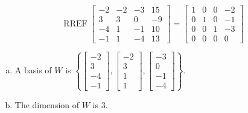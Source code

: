 \begin{exerciseAnswer} 


\[\operatorname{RREF} \left[\begin{array}{cccc}
-2 & -2 & -3 & 15 \\
3 & 3 & 0 & -9 \\
-4 & 1 & -1 & 10 \\
-1 & 1 & -4 & 13
\end{array}\right] = \left[\begin{array}{cccc}
1 & 0 & 0 & -2 \\
0 & 1 & 0 & -1 \\
0 & 0 & 1 & -3 \\
0 & 0 & 0 & 0
\end{array}\right] \]


\begin{enumerate}[(a)]
\item A basis of \(W\) is \( \left\{ \left[\begin{array}{c}
-2 \\
3 \\
-4 \\
-1
\end{array}\right] , \left[\begin{array}{c}
-2 \\
3 \\
1 \\
1
\end{array}\right] , \left[\begin{array}{c}
-3 \\
0 \\
-1 \\
-4
\end{array}\right] \right\} \).
\item The dimension of \(W\) is \( 3 \).
\end{enumerate}
    
\end{exerciseAnswer}
    
